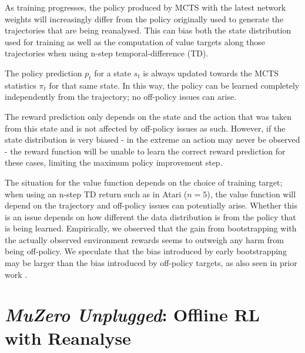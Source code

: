 \documentclass{article}
\newcommand{\mzunplugged}{\emph{MuZero Unplugged}}
\begin{document}
As training progresses, the policy produced by MCTS with the latest network weights will increasingly differ from the policy originally used to generate the trajectories that are being reanalysed. This can bias both the state distribution used for training as well as the computation of value targets along those trajectories when using n-step temporal-difference (TD).

The policy prediction $p_t$ for a state $s_t$ is always updated towards the MCTS statistics $\pi_t$ for that same state. In this way, the policy can be learned completely independently from the trajectory; no off-policy issues can arise.

The reward prediction only depends on the state and the action that was taken from this state and is not affected by off-policy issues as such. However, if the state distribution is very biased - in the extreme an action may never be observed - the reward function will be unable to learn the correct reward prediction for these cases, limiting the maximum policy improvement step.

The situation for the value function depends on the choice of training target; when using an n-step TD return such as in Atari ($n = 5$), the value function will depend on the trajectory and off-policy issues can potentially arise. Whether this is an issue depends on how different the data distribution is from the policy that is being learned. Empirically, we observed that the gain from bootstrapping with the actually observed environment rewards seems to outweigh any harm from being off-policy. We speculate that the bias introduced by early bootstrapping may be larger than the bias introduced by off-policy targets, as also seen in prior work \cite{alphastar}.


\section{\mzunplugged{}: Offline RL with Reanalyse}
\label{sec:offline}
\end{document}
